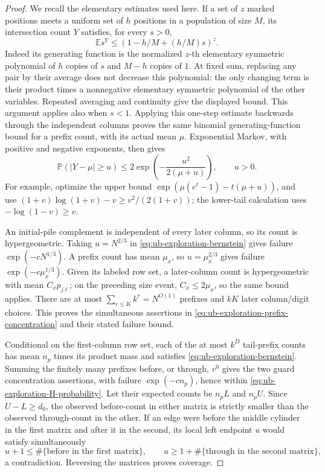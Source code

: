 \documentclass[11pt]{article}
\numberwithin{equation}{section}
\newcommand{\E}{\mathbb E}
\newcommand{\Pp}{\mathbb P}
\newcommand{\1}{\mathbf 1}
\begin{document}
\begin{proof}
We recall the elementary estimates used here. If a set of \(z\)
marked positions meets a uniform set of \(h\) positions in a
population of size \(M\), its intersection count \(Y\) satisfies,
for every \(s>0\),
\[
 \E s^Y\le(1-h/M+(h/M)s)^z.
\]
Indeed its generating function is the normalized \(z\)-th
elementary symmetric polynomial of \(h\) copies of \(s\) and
\(M-h\) copies of \(1\). At fixed sum, replacing any pair by their
average does not decrease this polynomial: the only changing term is
their product times a nonnegative elementary symmetric polynomial
of the other variables. Repeated averaging and continuity give the
displayed bound. This argument applies also when \(s<1\).
Applying this one-step estimate backwards through the independent
columns proves the same binomial generating-function bound for a
prefix count, with its actual mean \(\mu\). Exponential Markov,
with positive and negative exponents, then gives
\begin{equation}
\label{eq:ub-exploration-bernstein}
 \Pp(|Y-\mu|\ge u)
 \le2\exp\left(-\frac{u^2}{2(\mu+u)}\right),\qquad u>0.
\end{equation}
For example, optimize the upper bound
\(\exp(\mu(e^t-1)-t(\mu+u))\), and use
\((1+v)\log(1+v)-v\ge v^2/(2(1+v))\); the lower-tail
calculation uses \(-\log(1-v)\ge v\).

An initial-pile complement is independent of every later column,
so its count is hypergeometric. Taking \(u=N^{2/3}\) in
\eqref{eq:ub-exploration-bernstein} gives failure
\(\exp(-cN^{1/3})\). A prefix count has mean \(\mu_x\), so
\(u=\mu_x^{2/3}\) gives failure \(\exp(-c\mu_x^{1/3})\).
Given its labeled row set, a later-column count is hypergeometric
with mean \(C_xp_{j\ell}\); on the preceding size event,
\(C_x\le2\mu_x\), so the same bound applies. There are at most
\(\sum_{r\le K}k^r=N^{O(1)}\) prefixes and \(kK\) later
column/digit choices. This proves the simultaneous assertions in
\eqref{eq:ub-exploration-prefix-concentration} and their stated
failure bound.

Conditional on the first-column row set, each of the at most \(k^D\)
tail-prefix counts has mean \(n_p\) times its product mass and
satisfies \eqref{eq:ub-exploration-bernstein}. Summing the finitely
many prefixes before, or through, \(v^0\) gives the two guard
concentration assertions, with failure \(\exp(-c n_p)\), hence
within \eqref{eq:ub-exploration-H-probability}. Let their expected
counts be \(n_pL\) and \(n_pU\). Since \(U-L\ge d_0\), the
observed before-count in either matrix is strictly smaller than the
observed through-count in the other. If an edge were before the
middle cylinder in the first matrix and after it in the second, its
local left endpoint \(u\) would satisfy simultaneously
\[
 u+1\le\#\{\text{before in the first matrix}\},\qquad
 u\ge1+\#\{\text{through in the second matrix}\},
\]
a contradiction. Reversing the matrices proves coverage.


\end{proof}
\end{document}
